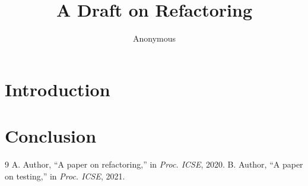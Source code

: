 \documentclass[12pt,a4paper]{article}
\begin{document}
\title{A Draft on Refactoring}
\author{Anonymous}
\maketitle
\begin{abstract}
\lipsum[1]
\end{abstract}
\section{Introduction}
\lipsum[2-8]
\section{Conclusion}
\lipsum[9-10]
\begin{thebibliography}{9}
 A. Author, ``A paper on refactoring,'' in \emph{Proc. ICSE}, 2020.
 B. Author, ``A paper on testing,'' in \emph{Proc. ICSE}, 2021.
\end{thebibliography}
\end{document}
